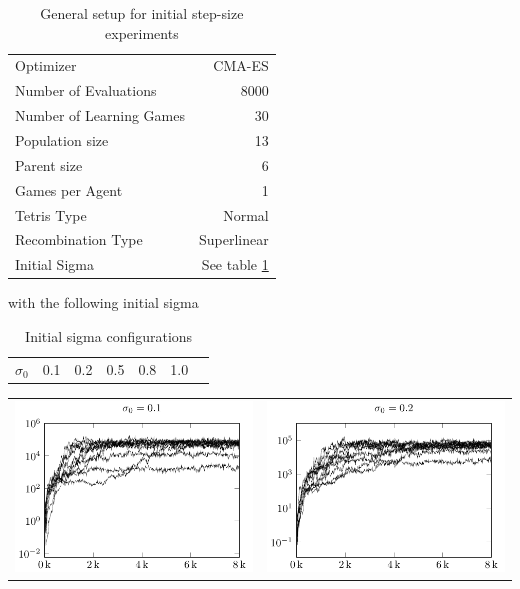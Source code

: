 \begin{table}[h]
\centering
\begin{tabular}{l r}
Optimizer & CMA-ES\\
Number of Evaluations & 8000\\
Number of Learning Games &30\\
Population size& 13\\
Parent size & 6\\
Games per Agent & 1\\
Tetris Type & Normal\\
\hline
Recombination Type & Superlinear\\
Initial Sigma & See table \ref{InitialSigmaTest}
\end{tabular}
\caption{General setup for initial step-size experiments}
\end{table}

with the following initial sigma

\begin{table}[H]
\centering
\begin{tabular}{c | c c c c c c}
$\sigma_0$ & 0.1 & 0.2 & 0.5 & 0.8 & 1.0
\end{tabular}
\caption{Initial sigma configurations \label{InitialSigmaTest}}
\end{table}

\begin{tabular}{@{}l@{}l@{}}
\includegraphics[scale=1]{plots/cma_initial_sigma_0_1} &
\includegraphics[scale=1]{plots/cma_initial_sigma_0_2}
\end{tabular}

